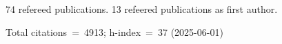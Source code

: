 74 refereed publications. 13 refeered publications as first author.

Total citations~=~4913; h-index~=~37 (2025-06-01)
